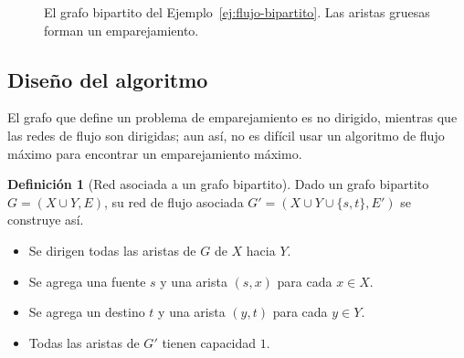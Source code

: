 \documentclass[12pt, spanish, oneside, openany]{book}
\theoremstyle{uprightplain}
\theoremstyle{definition}
\newtheorem{definicion}[teorema]{Definición}
\theoremstyle{remark}
\theoremstyle{definition}
\begin{document}
\begin{figure}[H]
\centering
{}
\caption{El grafo bipartito del Ejemplo~\ref{ej:flujo-bipartito}. Las aristas
gruesas forman un emparejamiento.}
\label{fig:flujo-bipartito}
\end{figure}

\subsection{Diseño del algoritmo}

El grafo que define un problema de emparejamiento es no dirigido, mientras que las redes de flujo son dirigidas; aun así, no es difícil usar un algoritmo de flujo máximo para encontrar un emparejamiento máximo.

\begin{definicion}[Red asociada a un grafo bipartito]
\label{def:flujo-red-bipartita}
Dado un grafo bipartito $G=(X\cup Y,E)$, su red de flujo asociada $G'=(X\cup Y\cup\{s,t\},E')$ se construye así.
\begin{itemize}
    \item Se dirigen todas las aristas de $G$ de $X$ hacia $Y$.
    \item Se agrega una fuente $s$ y una arista $(s,x)$ para cada $x\in X$.
    \item Se agrega un destino $t$ y una arista $(y,t)$ para cada $y\in Y$.
    \item Todas las aristas de $G'$ tienen capacidad $1$.
\end{itemize}
\end{definicion}
\end{document}

